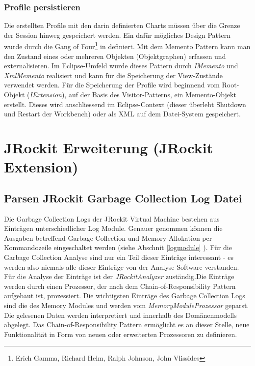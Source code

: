 \subsubsection{Profile persistieren}
Die erstellten Profile mit den darin definierten Charts müssen über die Grenze der Session hinweg gespeichert werden. Ein dafür mögliches Design Pattern wurde durch die Gang of Four\footnote{Erich Gamma, Richard Helm, Ralph Johnson, John Vlissides} in \cite[S. 283]{gamma1995design} definiert. Mit dem Memento Pattern kann man den Zustand eines oder mehreren Objekten (Objektgraphen) erfassen und externalisieren. Im Eclipse-Umfeld wurde dieses Pattern durch \textit{IMemento} und \textit{XmlMemento} realisiert und kann für die Speicherung der View-Zustände verwendet werden. Für die Speicherung der Profile wird beginnend vom Root-Objekt (\textit{IExtension}), auf der Basis des Visitor-Patterns\cite[S. 331]{gamma1995design}, ein Memento-Objekt erstellt. Dieses wird anschliessend im Eclipse-Context (dieser überlebt Shutdown und Restart der Workbench) oder als XML auf dem Datei-System gespeichert. 



\section{JRockit Erweiterung (JRockit Extension)}
\subsection{Parsen JRockit Garbage Collection Log Datei}
Die Garbage Collection Logs der JRockit Virtual Machine bestehen aus Einträgen unterschiedlicher Log Module. Genauer genommen können die Ausgaben betreffend Garbage Collection und Memory Allokation per Kommandozeile eingeschaltet werden (siehe Abschnit \ref{logmodule} ). Für die Garbage Collection Analyse sind nur ein Teil dieser Einträge interessant - es werden also niemals alle dieser Einträge von der Analyse-Software verstanden. Für die Analyse der Einträge ist der \textit{JRockitAnalyzer} zuständig.Die Einträge werden durch einen Prozessor, der nach dem Chain-of-Responsibility Pattern\cite{wiki:chainOfResponsibilityPattern} aufgebaut ist, prozessiert. Die wichtigsten Einträge des Garbage Collection Logs sind die des Memory Modules und werden vom 
\textit{MemoryModuleProzessor} geparst. Die gelesenen Daten werden interpretiert und innerhalb des Domänenmodells abgelegt. Das Chain-of-Responsibility Pattern ermöglicht es an dieser Stelle, neue Funktionalität in Form von neuen oder erweiterten Prozessoren zu definieren.

